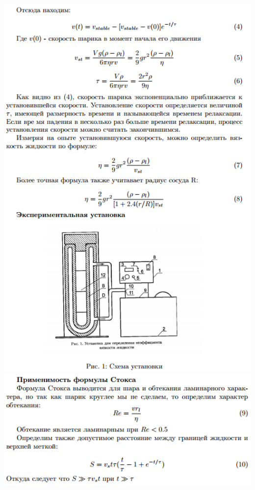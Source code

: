 \documentclass[12pt]{article}
\begin{document}
\begin{center}
    	\includegraphics[width=14cm]{theory2.png}
    	\includegraphics[width=14cm]{theory3.png}
    \end{center}
    
    
\end{document}
